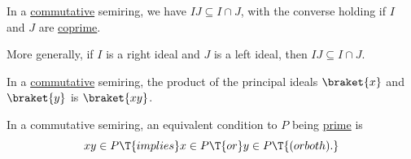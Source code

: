 \begin{proposition}
\begin{thmenum}
     In a \hyperref[def:semiring/commutative]{commutative} semiring, we have \( IJ \subseteq I \cap J \), with the converse holding if \( I \) and \( J \) are \hyperref[def:semiring_ideal/coprime]{coprime}.

    More generally, if \( I \) is a right ideal and \( J \) is a left ideal, then \( IJ \subseteq I \cap J \).

     In a \hyperref[def:semiring/commutative]{commutative} semiring, the product of the principal ideals \( \braket{x} \) and \( \braket{y} \) is \( \braket{xy} \).

     In a commutative semiring, an equivalent condition to \( P \) being \hyperref[def:semiring_ideal/prime]{prime} is
    \begin{equation}\label{eq:thm:def:semiring_ideal/prime_pointwise}
      xy \in P \T{implies} x \in P \T{or} y \in P \T{(or both).}
    \end{equation}
  \end{thmenum}
\end{proposition}
